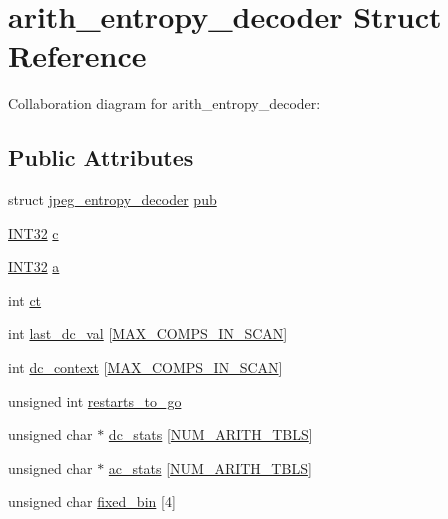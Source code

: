 \hypertarget{structarith__entropy__decoder}{}\section{arith\+\_\+entropy\+\_\+decoder Struct Reference}
\label{structarith__entropy__decoder}


Collaboration diagram for arith\+\_\+entropy\+\_\+decoder\+:
\subsection*{Public Attributes}
\begin{DoxyCompactItemize}
\item 
struct \mbox{\hyperlink{structjpeg__entropy__decoder}{jpeg\+\_\+entropy\+\_\+decoder}} \mbox{\hyperlink{structarith__entropy__decoder_a26f1da810c05744076bad3072983d0d1}{pub}}
\item 
\mbox{\hyperlink{jmorecfg_8h_a0cb58e7e6f0bad369840a52e54a56ae0}{I\+N\+T32}} \mbox{\hyperlink{structarith__entropy__decoder_abad1e8f477d4015c7069855679885618}{c}}
\item 
\mbox{\hyperlink{jmorecfg_8h_a0cb58e7e6f0bad369840a52e54a56ae0}{I\+N\+T32}} \mbox{\hyperlink{structarith__entropy__decoder_afb33bbe1e85d3d76b8b119a46db68a77}{a}}
\item 
int \mbox{\hyperlink{structarith__entropy__decoder_a6c907da02b3db27a4b0f025733a44109}{ct}}
\item 
int \mbox{\hyperlink{structarith__entropy__decoder_afd8cad23cfc049f4ae748308f239bb20}{last\+\_\+dc\+\_\+val}} \mbox{[}\mbox{\hyperlink{jpeglib_8h_adc7013da016c19051dc623fb3d8b35b4}{M\+A\+X\+\_\+\+C\+O\+M\+P\+S\+\_\+\+I\+N\+\_\+\+S\+C\+AN}}\mbox{]}
\item 
int \mbox{\hyperlink{structarith__entropy__decoder_a0b9a2123aec7d879cff09e315530d5e8}{dc\+\_\+context}} \mbox{[}\mbox{\hyperlink{jpeglib_8h_adc7013da016c19051dc623fb3d8b35b4}{M\+A\+X\+\_\+\+C\+O\+M\+P\+S\+\_\+\+I\+N\+\_\+\+S\+C\+AN}}\mbox{]}
\item 
unsigned int \mbox{\hyperlink{structarith__entropy__decoder_ab587034265fc6747822cfb11167e4004}{restarts\+\_\+to\+\_\+go}}
\item 
unsigned char $\ast$ \mbox{\hyperlink{structarith__entropy__decoder_a0a8fd2a17e1e838e9194fab8579463d5}{dc\+\_\+stats}} \mbox{[}\mbox{\hyperlink{jpeglib_8h_a4efb0fccc8d9db72ca18f32a26fad6ab}{N\+U\+M\+\_\+\+A\+R\+I\+T\+H\+\_\+\+T\+B\+LS}}\mbox{]}
\item 
unsigned char $\ast$ \mbox{\hyperlink{structarith__entropy__decoder_ad24b1d5f8dae5839bca9cc749bf9f06e}{ac\+\_\+stats}} \mbox{[}\mbox{\hyperlink{jpeglib_8h_a4efb0fccc8d9db72ca18f32a26fad6ab}{N\+U\+M\+\_\+\+A\+R\+I\+T\+H\+\_\+\+T\+B\+LS}}\mbox{]}
\item 
unsigned char \mbox{\hyperlink{structarith__entropy__decoder_a3e88e1dc54dd33d41dd937a8dc03342a}{fixed\+\_\+bin}} \mbox{[}4\mbox{]}
\end{DoxyCompactItemize}


